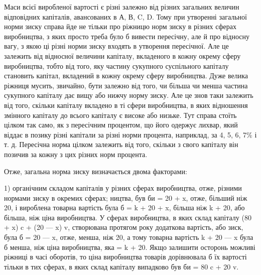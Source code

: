 Маси всієї виробленої вартості є різні залежно від різних загальних величин відповідних капіталів,
авансованих в А, В, C, D.
Тому при утворенні загальної норми зиску справа йде не тільки
про ріжницю норм зиску в різних сферах виробництва, з яких
просто треба було б вивести пересічну, але й про відносну вагу,
з якою ці різні норми зиску входять в утворення пересічної.
Але це залежить від відносної величини капіталу, вкладеного
в кожну окрему сферу виробництва, тобто від того, яку частину
сукупного суспільного капіталу становить капітал, вкладений
в кожну окрему сферу виробництва. Дуже велика ріжниця мусить, звичайно, бути залежно від того, чи
більша чи менша
частина сукупного капіталу дає вищу або нижчу норму зиску.
Але це знов таки залежить від того, скільки капіталу вкладено
в ті сфери виробництва, в яких відношення змінного капіталу
до всього капіталу є високе або низьке. Тут справа стоїть цілком
так само, як з пересічним процентом, що його одержує лихвар,
який віддає в позику різні капітали за різні норми процента, наприклад, за 4, 5, 6, 7\% і т. д.
Пересічна норма цілком залежить
від того, скільки з свого капіталу він позичив за кожну з цих
різних норм процента.

Отже, загальна норма зиску визначається двома факторами:

1) органічним складом капіталів у різних сферах виробництва,
отже, різними нормами зиску в окремих сферах;
ництва, був би = 20 + x, отже, більший ніж 20, і вироблена
товарна вартість була б = k + 20 + x, більша ніж k + 20, або
більша, ніж ціна виробництва. У сферах виробництва, в яких
склад капіталу (80 + x) c + (20 — x) v, створювана протягом року
додаткова вартість, або зиск, була б = 20 — x, отже, менша, ніж 20,
а тому товарна вартість k + 20 — x була б менша, ніж ціна виробництва, яка = k + 20. Якщо залишити
осторонь можливі ріжниці в часі оборотів, то ціна виробництва товарів дорівнювала б їх вартості
тільки в тих сферах, в яких склад капіталу випадково був би = 80 c + 20 v.

